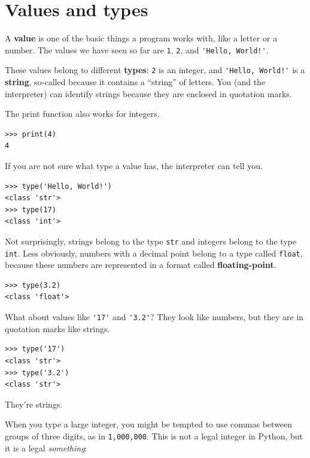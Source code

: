 \documentclass[10pt]{book}
\begin{document}
\section{Values and types}

A {\bf value} is one of the basic things a program works with,
like a letter or a
number.  The values we have seen so far
are {\tt 1}, {\tt 2}, and
\verb"'Hello, World!'".

These values belong to different {\bf types}:
{\tt 2} is an integer, and \verb"'Hello, World!'" is a {\bf string},
so-called because it contains a ``string'' of letters.
You (and the interpreter) can identify
strings because they are enclosed in quotation marks.


The print function also works for integers.

\beforeverb
\begin{verbatim}
>>> print(4)
4
\end{verbatim}
\afterverb
%
If you are not sure what type a value has, the interpreter can tell you.

\beforeverb
\begin{verbatim}
>>> type('Hello, World!')
<class 'str'>
>>> type(17)
<class 'int'>
\end{verbatim}
\afterverb
%
Not surprisingly, strings belong to the type {\tt str} and
integers belong to the type {\tt int}.  Less obviously, numbers
with a decimal point belong to a type called {\tt float},
because these numbers are represented in a
format called {\bf floating-point}.


\beforeverb
\begin{verbatim}
>>> type(3.2)
<class 'float'>
\end{verbatim}
\afterverb
%
What about values like \verb"'17'" and \verb"'3.2'"?
They look like numbers, but they are in quotation marks like
strings.


\beforeverb
\begin{verbatim}
>>> type('17')
<class 'str'>
>>> type('3.2')
<class 'str'>
\end{verbatim}
\afterverb
%
They're strings.

When you type a large integer, you might be tempted to use commas
between groups of three digits, as in {\tt 1,000,000}.  This is not a
legal integer in Python, but it is a legal \emph{something}:
\end{document}
